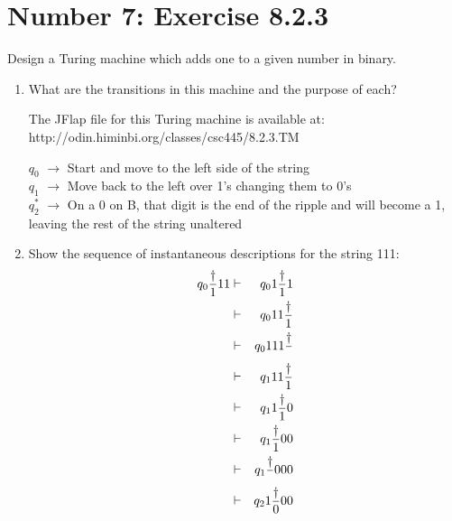 \documentclass[12pt,a4paper,twoside]{article}  %
\begin{document}
\section{Number 7: Exercise 8.2.3}

Design a Turing machine which adds one to a given number in binary.

\begin{enumerate}

\item What are the transitions in this machine and the purpose of
  each?

The JFlap file for this Turing machine is available at: \\
 {http://odin.himinbi.org/classes/csc445/8.2.3.TM}

$q_0$ $\rightarrow$ Start and move to the left side of the string \\
$q_1$  $\rightarrow$ Move back to the left over 1's changing them to 0's \\
$q_2^*$ $\rightarrow$ On a 0 on B, that digit is the end of the ripple
         and will become a 1, leaving the rest of the string unaltered

\item Show the sequence of instantaneous descriptions for the string
  111:
\begin{eqnarray}
q_0 {\dagger\over{1}}11 &\vdash& q_0 1{\dagger\over{1}}1 \nonumber\\
      &\vdash& q_0 11{\dagger\over{1}} \nonumber\\
      &\vdash& q_0 111{\dagger\over{ }} \nonumber\\
      &\vdash& q_1 11{\dagger\over{1}} \nonumber\\
      &\vdash& q_1 1{\dagger\over{1}}0 \nonumber\\
      &\vdash& q_1 {\dagger\over{1}}00 \nonumber\\
      &\vdash& q_1 {\dagger\over{ }}000 \nonumber\\
      &\vdash& q_2 1{\dagger\over{0}}00 \nonumber
\end{eqnarray}

\end{enumerate}
\end{document}
